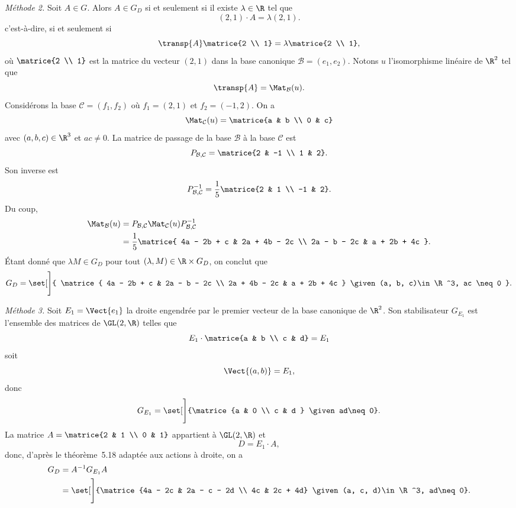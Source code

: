 \begin{enumerate}
    \emph{Méthode 2.}
    Soit $A\in G$.
    Alors $A\in G_D$ si et seulement si il existe $\lambda\in\R$ tel que
    \[
      (2, 1)\cdot A = \lambda (2, 1).
    \]
    c'est-à-dire, si et seulement si
    \[
      \transp{A}\matrice{2 \\ 1} = \lambda\matrice{2 \\ 1},
    \]
    où $\matrice{2 \\ 1}$ est la matrice du vecteur $(2, 1)$ dans la base canonique $\mathcal{B} = (e_1, e_2)$.
    Notons $u$ l'isomorphisme linéaire de $\R^2$ tel que
    \[
      \transp{A} = \Mat_{\mathcal{B}}(u).
    \]
    Considérons la base $\mathcal{C} = (f_1, f_2)$ où $f_1 = (2, 1)$ et $f_2 = (-1, 2)$.
    On a
    \[
      \Mat_{\mathcal{C}}(u) = \matrice{a & b \\ 0 & c}
    \]
    avec $(a, b, c)\in\R^3$ et $ac \neq 0$.
    La matrice de passage de la base $\mathcal{B}$ à la base $\mathcal{C}$ est
    \[
      P_{\mathcal{B}, \mathcal{C}} = \matrice{2 & -1 \\ 1 & 2}.
    \]
    Son inverse est
    \[
      P_{\mathcal{B}, \mathcal{C}}^{-1} = \frac{1}{5 }\matrice{2 & 1 \\ -1 & 2}.
    \]
    Du coup,
    \begin{align*}
      \Mat_{\mathcal{B}}(u)
        &= P_{\mathcal{B}, \mathcal{C}} \Mat_{\mathcal{C}}(u) P_{\mathcal{B}, \mathcal{C}}^{-1} \\
        &= \frac{1}{5}
            \matrice{
              4a - 2b + c & 2a + 4b - 2c \\
              2a - b - 2c & a + 2b + 4c
            }.
    \end{align*}
    Étant donné que $\lambda M\in G_D$ pour tout $(\lambda, M)\in\R\times G_D$, on conclut que
    \[
      G_D = \set[\Bigg]{
              \matrice{
                4a - 2b + c & 2a - b - 2c \\
                2a + 4b - 2c & a + 2b + 4c
              }
              \given (a, b, c)\in\R^3, ac \neq 0
            }.
    \]

    \emph{Méthode 3.}
    Soit $E_1 = \Vect{e_1}$ la droite engendrée par le premier vecteur de la base canonique de $\R^2$.
    Son stabilisateur $G_{E_1}$ est l'ensemble des matrices de $\GL(2, \R)$ telles que
    \[
      E_1\cdot\matrice{a & b \\ c & d} = E_1
    \]
    soit
    \[
      \Vect{(a, b)} = E_1,
    \]
    donc
    \[
      G_{E_1} = \set[\Bigg]{\matrice{a & 0 \\ c & d } \given ad\neq 0}.
    \]
    La matrice $A = \matrice{2 & 1 \\ 0 & 1}$ appartient à $\GL(2, \R)$ et
    \[
      D = E_1\cdot A,
    \]
    donc, d'après le théorème~5.18 adaptée aux actions à droite, on a
    \begin{align*}
      G_D &= A^{-1} G_{E_1} A \\
          &= \set[\Bigg]{\matrice{4a - 2c & 2a - c - 2d \\ 4c & 2c + 4d} \given (a, c, d)\in\R^3, ad\neq 0}.
    \end{align*}


\end{enumerate}
